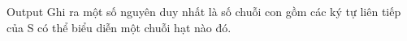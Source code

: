 Output
Ghi ra một số nguyên duy nhất là số chuỗi con gồm các ký tự liên tiếp của S có thể biểu diễn một chuỗi hạt nào đó.